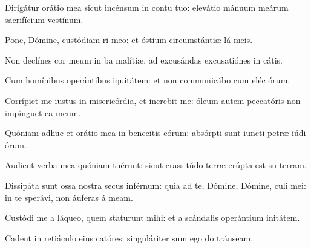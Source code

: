 \item {}

\item Dirigátur orátio mea sicut incénsum in contu tuo:\psstar{} elevátio mánuum meárum sacrifícium vestínum.

\item Pone, Dómine, custódiam ri meo:\psstar{} et óstium circumstántiæ lá meis.

\item Non declínes cor meum in ba malítiæ,\psstar{} ad excusándas excusatiónes in cátis.

\item Cum homínibus operántibus iquitátem:\psstar{} et non communicábo cum eléc órum.

\item Corrípiet me iustus in misericórdia, et increbit me:\psstar{} óleum autem peccatóris non impínguet ca meum.

\item Quóniam adhuc et orátio mea in benecitis eórum:\psstar{} absórpti sunt iuncti petræ iúdi órum.

\item Audient verba mea quóniam tuérunt:\psstar{} sicut crassitúdo terræ erúpta est su terram.

\item Dissipáta sunt ossa nostra secus inférnum:\pscross{} quia ad te, Dómine, Dómine, culi mei:\psstar{} in te sperávi, non áuferas á meam.

\item Custódi me a láqueo, quem staturunt mihi:\psstar{} et a scándalis operántium initátem.

\item Cadent in retiáculo eius catóres:\psstar{} singuláriter sum ego do tránseam.
